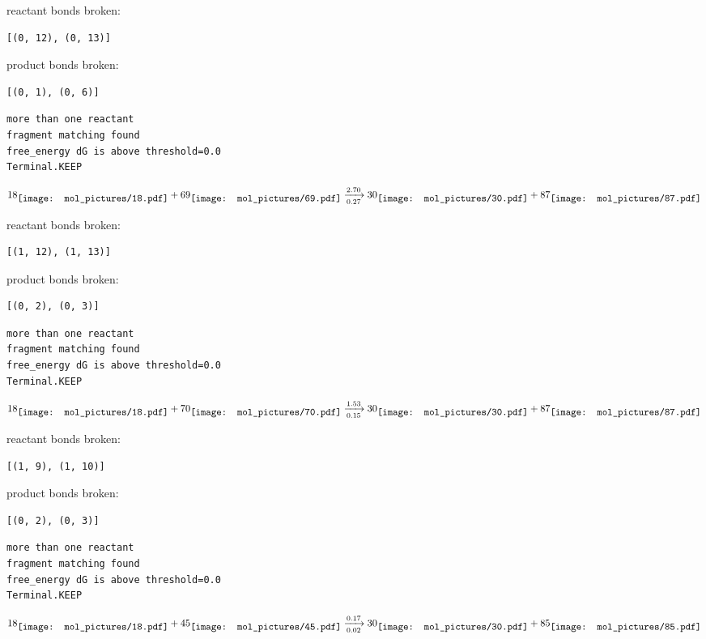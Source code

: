 \documentclass{article}
\begin{document}
reactant bonds broken:\begin{verbatim}
[(0, 12), (0, 13)]
\end{verbatim}
product bonds broken:\begin{verbatim}
[(0, 1), (0, 6)]
\end{verbatim}




\vspace{1cm}
\begin{verbatim}
more than one reactant
fragment matching found
free_energy dG is above threshold=0.0
Terminal.KEEP
\end{verbatim}
$$
18
\raisebox{-.5\height}{\texttt{[image: mol\_pictures/18.pdf]}}
+
69
\raisebox{-.5\height}{\texttt{[image: mol\_pictures/69.pdf]}}
\xrightarrow[0.27]{2.70}
30
\raisebox{-.5\height}{\texttt{[image: mol\_pictures/30.pdf]}}
+
87
\raisebox{-.5\height}{\texttt{[image: mol\_pictures/87.pdf]}}
$$


reactant bonds broken:\begin{verbatim}
[(1, 12), (1, 13)]
\end{verbatim}
product bonds broken:\begin{verbatim}
[(0, 2), (0, 3)]
\end{verbatim}




\vspace{1cm}
\begin{verbatim}
more than one reactant
fragment matching found
free_energy dG is above threshold=0.0
Terminal.KEEP
\end{verbatim}
$$
18
\raisebox{-.5\height}{\texttt{[image: mol\_pictures/18.pdf]}}
+
70
\raisebox{-.5\height}{\texttt{[image: mol\_pictures/70.pdf]}}
\xrightarrow[0.15]{1.53}
30
\raisebox{-.5\height}{\texttt{[image: mol\_pictures/30.pdf]}}
+
87
\raisebox{-.5\height}{\texttt{[image: mol\_pictures/87.pdf]}}
$$


reactant bonds broken:\begin{verbatim}
[(1, 9), (1, 10)]
\end{verbatim}
product bonds broken:\begin{verbatim}
[(0, 2), (0, 3)]
\end{verbatim}




\vspace{1cm}
\begin{verbatim}
more than one reactant
fragment matching found
free_energy dG is above threshold=0.0
Terminal.KEEP
\end{verbatim}
$$
18
\raisebox{-.5\height}{\texttt{[image: mol\_pictures/18.pdf]}}
+
45
\raisebox{-.5\height}{\texttt{[image: mol\_pictures/45.pdf]}}
\xrightarrow[0.02]{0.17}
30
\raisebox{-.5\height}{\texttt{[image: mol\_pictures/30.pdf]}}
+
85
\raisebox{-.5\height}{\texttt{[image: mol\_pictures/85.pdf]}}
$$
\end{document}
